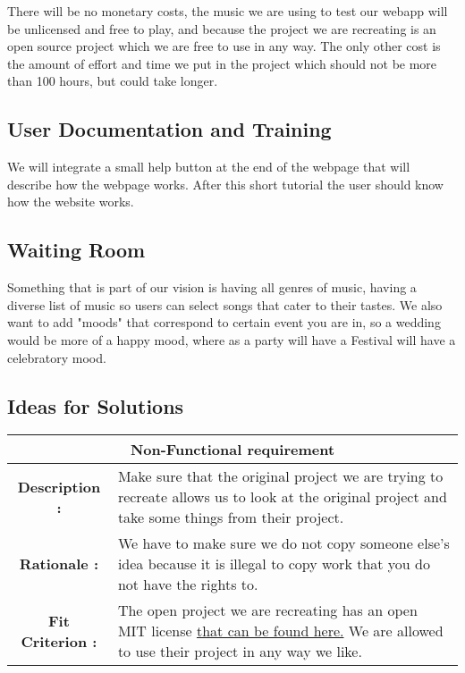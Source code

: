 \documentclass[12pt, titlepage]{article}
\begin{document}
There will be no monetary costs, the music we are using to test our webapp will be unlicensed and free to play, and because the project we are recreating is an open source project which we are free to use in any way. The only other cost is the amount of effort and time we put in the project which should not be more than 100 hours, but could take longer.

\subsection{User Documentation and Training}

We will integrate a small help button at the end of the webpage that will describe how the webpage works. After this short tutorial the user should know how the website works.

\subsection{Waiting Room}

Something that is part of our vision is having all genres of music, having a diverse list of music so users can select songs that cater to their tastes. We also want to add "moods" that correspond to certain event you are in, so a wedding would be more of a happy mood, where as a party will have a Festival will have a celebratory mood.

\subsection{Ideas for Solutions}
\begin{center}
\begin{table}[H]
\begin{tabularx}{\textwidth}{| c X |}
\hline
\multicolumn{2}{|c|}{\textbf{Non-Functional requirement}}\\
\hline
\textbf{Description : } & Make sure that the original project we are trying to recreate allows us to look at the original project and take some things from their project. \\
\hline
\textbf{Rationale : } & We have to make sure we do not copy someone else's idea because it is illegal to copy work that you do not have the rights to. \\
\hline
\textbf{Fit Criterion : } & The open project we are recreating has an open MIT license \href{LICENSE.txt} {that can be found here.} We are allowed to use their project in any way we like.\\
\hline
\end{tabularx}
\end{table}
\end{center}
\end{document}
